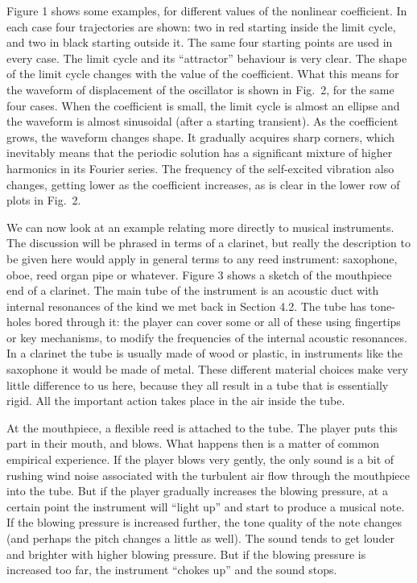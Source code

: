   Figure 1 shows some examples, for different values of the nonlinear 
  coefficient. In each case four trajectories are shown: two in red starting 
  inside the limit cycle, and two in black starting outside it. The same four 
  starting points are used in every case. The limit cycle and its ``attractor'' 
  behaviour is very clear. The shape of the limit cycle changes with the value 
  of the coefficient. What this means for the waveform of displacement of the 
  oscillator is shown in Fig.\ 2, for the same four cases. When the coefficient 
  is small, the limit cycle is almost an ellipse and the waveform is almost 
  sinusoidal (after a starting transient). As the coefficient grows, the 
  waveform changes shape. It gradually acquires sharp corners, which inevitably 
  means that the periodic solution has a significant mixture of higher 
  harmonics in its Fourier series. The frequency of the self-excited vibration 
  also changes, getting lower as the coefficient increases, as is clear in the 
  lower row of plots in Fig.\ 2. 

  We can now look at an example relating more directly to musical instruments. 
  The discussion will be phrased in terms of a clarinet, but really the 
  description to be given here would apply in general terms to any reed 
  instrument: saxophone, oboe, reed organ pipe or whatever. Figure 3 shows a 
  sketch of the mouthpiece end of a clarinet. The main tube of the instrument 
  is an acoustic duct with internal resonances of the kind we met back in 
  Section 4.2. The tube has tone-holes bored through it: the player can cover 
  some or all of these using fingertips or key mechanisms, to modify the 
  frequencies of the internal acoustic resonances. In a clarinet the tube is 
  usually made of wood or plastic, in instruments like the saxophone it would 
  be made of metal. These different material choices make very little 
  difference to us here, because they all result in a tube that is essentially 
  rigid. All the important action takes place in the air inside the tube. 


  At the mouthpiece, a flexible reed is attached to the tube. The player puts 
  this part in their mouth, and blows. What happens then is a matter of common 
  empirical experience. If the player blows very gently, the only sound is a 
  bit of rushing wind noise associated with the turbulent air flow through the 
  mouthpiece into the tube. But if the player gradually increases the blowing 
  pressure, at a certain point the instrument will “light up” and start to 
  produce a musical note. If the blowing pressure is increased further, the 
  tone quality of the note changes (and perhaps the pitch changes a little as 
  well). The sound tends to get louder and brighter with higher blowing 
  pressure. But if the blowing pressure is increased too far, the instrument 
  “chokes up” and the sound stops. 

